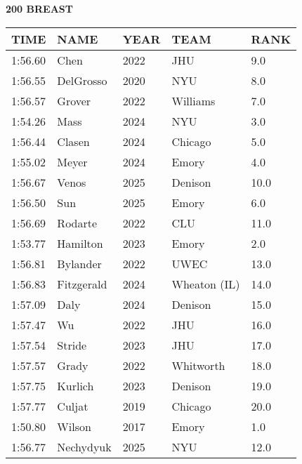 \begin{minipage}[t]{0.48\textwidth}
\centering
\textbf{200 BREAST}\\[0.05cm]
\begin{tabular}{@{}p{1.8cm}p{2.8cm}p{1.2cm}p{1.4cm}p{0.8cm}@{}}
\hline
\textbf{TIME} & \textbf{NAME} & \textbf{YEAR} & \textbf{TEAM} & \textbf{RANK} \\
\hline
1:56.60 & Chen & 2022 & JHU & 9.0 \\
1:56.55 & DelGrosso & 2020 & NYU & 8.0 \\
1:56.57 & Grover & 2022 & Williams & 7.0 \\
1:54.26 & Mass & 2024 & NYU & 3.0 \\
1:56.44 & Clasen & 2024 & Chicago & 5.0 \\
1:55.02 & Meyer & 2024 & Emory & 4.0 \\
1:56.67 & Venos & 2025 & Denison & 10.0 \\
1:56.50 & Sun & 2025 & Emory & 6.0 \\
1:56.69 & Rodarte & 2022 & CLU & 11.0 \\
1:53.77 & Hamilton & 2023 & Emory & 2.0 \\
1:56.81 & Bylander & 2022 & UWEC & 13.0 \\
1:56.83 & Fitzgerald & 2024 & Wheaton (IL) & 14.0 \\
1:57.09 & Daly & 2024 & Denison & 15.0 \\
1:57.47 & Wu & 2022 & JHU & 16.0 \\
1:57.54 & Stride & 2023 & JHU & 17.0 \\
1:57.57 & Grady & 2022 & Whitworth & 18.0 \\
1:57.75 & Kurlich & 2023 & Denison & 19.0 \\
1:57.77 & Culjat & 2019 & Chicago & 20.0 \\
1:50.80 & Wilson & 2017 & Emory & 1.0 \\
1:56.77 & Nechydyuk & 2025 & NYU & 12.0 \\
\hline
\end{tabular}
\end{minipage}

\vspace{0.4cm}


